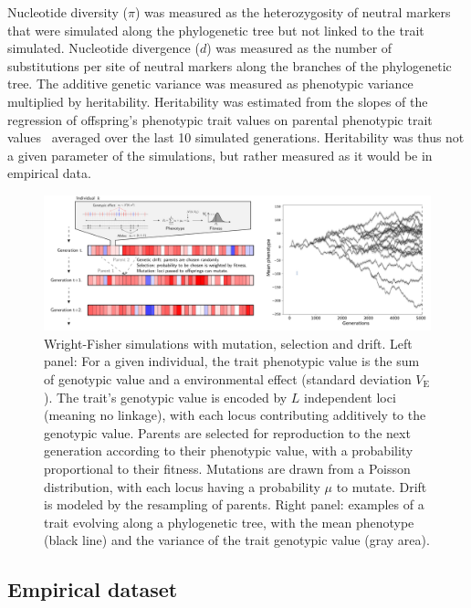 \documentclass{article}
\newcommand{\MutationRatePheno}{\mu}
\newcommand{\NbrLoci}{L}
\newcommand{\VarEnv}{V_{\mathrm{E}}}
\begin{document}
Nucleotide diversity ($\pi$) was measured as the heterozygosity of neutral markers that were simulated along the phylogenetic tree but not linked to the trait simulated.
Nucleotide divergence ($d$) was measured as the number of substitutions per site of neutral markers along the branches of the phylogenetic tree.
The additive genetic variance was measured as phenotypic variance multiplied by heritability.
Heritability was estimated from the slopes of the regression of offspring's phenotypic trait values on parental phenotypic trait values~\citep{lynch_genetics_1998} averaged over the last 10 simulated generations.
Heritability was thus not a given parameter of the simulations, but rather measured as it would be in empirical data.

\begin{figure}[!ht]
    \centering
    \includegraphics[width=\textwidth, page=1] {figure2}
    \caption{
        Wright-Fisher simulations with mutation, selection and drift.
        Left panel: For a given individual, the trait phenotypic value is the sum of genotypic value and a environmental effect (standard deviation $\VarEnv$).
        The trait's genotypic value is encoded by $\NbrLoci$ independent loci (meaning no linkage), with each locus contributing additively to the genotypic value.
        Parents are selected for reproduction to the next generation according to their phenotypic value, with a probability proportional to their fitness.
        Mutations are drawn from a Poisson distribution, with each locus having a probability $\MutationRatePheno$ to mutate.
        Drift is modeled by the resampling of parents.
        Right panel: examples of a trait evolving along a phylogenetic tree, with the mean phenotype (black line) and the variance of the trait genotypic value (gray area).
    }
    \label{fig:simulator}
\end{figure}

\subsection*{Empirical dataset}\label{subsec:empirical-dataset}
\end{document}
